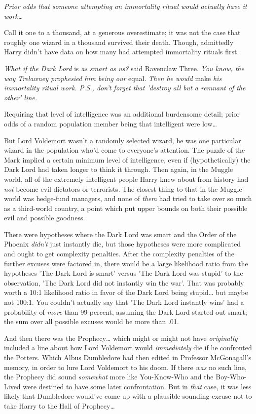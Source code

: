 \emph{Prior odds that someone attempting an immortality ritual would actually have it work{\ldots}}

Call it one to a thousand, at a generous overestimate; it was not the case that roughly one wizard in a thousand survived their death. Though, admittedly Harry didn't have data on how many had attempted immortality rituals first.

\emph{What if the Dark Lord} is\emph{ as smart as us?} said Ravenclaw Three. \emph{You know, the way Trelawney prophesied him being our} equal.\emph{ Then he would} make\emph{ his immortality ritual work. P.S., don't forget that 'destroy all but a remnant of the other' line.}

Requiring that level of intelligence was an additional burdensome detail; prior odds of a random population member being that intelligent were low{\ldots}

But Lord Voldemort wasn't a randomly selected wizard, he was one particular wizard in the population who'd come to everyone's attention. The puzzle of the Mark implied a certain minimum level of intelligence, even if (hypothetically) the Dark Lord had taken longer to think it through. Then again, in the Muggle world, all of the extremely intelligent people Harry knew about from history had \emph{not} become evil dictators or terrorists. The closest thing to that in the Muggle world was hedge-fund managers, and none of \emph{them} had tried to take over so much as a third-world country, a point which put upper bounds on both their possible evil and possible goodness.

There were hypotheses where the Dark Lord was smart and the Order of the Phoenix \emph{didn't} just instantly die, but those hypotheses were more complicated and ought to get complexity penalties. After the complexity penalties of the further excuses were factored in, there would be a large likelihood ratio from the hypotheses 'The Dark Lord is smart' versus 'The Dark Lord was stupid' to the observation, 'The Dark Lord did not instantly win the war'. That was probably worth a 10:1 likelihood ratio in favor of the Dark Lord being stupid{\ldots} but maybe not 100:1. You couldn't actually say that 'The Dark Lord instantly wins' had a probability of \emph{more} than 99 percent, assuming the Dark Lord started out smart; the sum over all possible excuses would be more than .01.

And then there was the Prophecy{\ldots} which might or might not have \emph{originally} included a line about how Lord Voldemort would \emph{immediately} die if he confronted the Potters. Which Albus Dumbledore had then edited in Professor McGonagall's memory, in order to lure Lord Voldemort to his doom. If there \emph{was} no such line, the Prophecy did sound \emph{somewhat} more like You-Know-Who and the Boy-Who-Lived were destined to have some later confrontation. But in \emph{that} case, it was less likely that Dumbledore would've come up with a plausible-sounding excuse not to take Harry to the Hall of Prophecy{\ldots}

